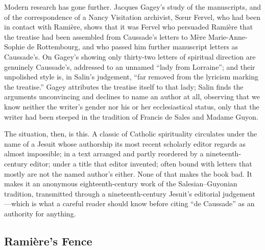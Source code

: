 Modern research has gone further. Jacques Gagey's study of the manuscripts, and of the correspondence of a Nancy Visitation archivist, Sœur Fervel, who had been in contact with Ramière, shows that it was Fervel who persuaded Ramière that the treatise had been assembled from Caussade's letters to Mère Marie-Anne-Sophie de Rottembourg, and who passed him further manuscript letters as Caussade's. On Gagey's showing only thirty-two letters of spiritual direction are genuinely Caussade's, addressed to an unnamed ``lady from Lorraine''; and their unpolished style is, in Salin's judgement, ``far removed from the lyricism marking the treatise.'' Gagey attributes the treatise itself to that lady; Salin finds the arguments unconvincing and declines to name an author at all, observing that we know neither the writer's gender nor his or her ecclesiastical status, only that the writer had been steeped in the tradition of Francis de Sales and Madame Guyon.

The situation, then, is this. A classic of Catholic spirituality circulates under the name of a Jesuit whose authorship its most recent scholarly editor regards as almost impossible; in a text arranged and partly reordered by a nineteenth-century editor; under a title that editor invented; often bound with letters that mostly are not the named author's either. None of that makes the book bad. It makes it an anonymous eighteenth-century work of the Salesian--Guyonian tradition, transmitted through a nineteenth-century Jesuit's editorial judgement---which is what a careful reader should know before citing ``de Caussade'' as an authority for anything.

\subsection{Ramière's Fence}

